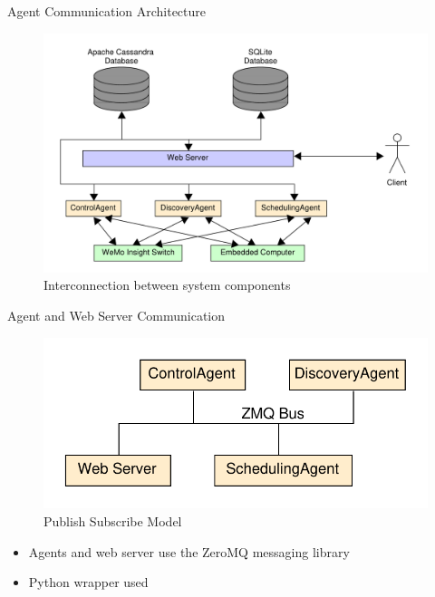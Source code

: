 \documentclass{beamer}
\begin{document}
\begin{frame}{Agent Communication Architecture}{}
    \begin{figure}
        \centering
        \includegraphics[scale=0.4]{figs/overallDiagram.pdf}
        \caption{Interconnection between system components}
        \label{fig:systemComponentInterconnection}
    \end{figure}
\end{frame}

\begin{frame}{Agent and Web Server Communication}{}
    \begin{figure}
        \centering
        \includegraphics[scale=0.5]{figs/pubSubAgents.pdf}
        \caption{Publish Subscribe Model}
        \label{fig:pubSubModel}
    \end{figure}
    \begin{itemize}
        \item Agents and web server use the ZeroMQ
        messaging library
        \item Python wrapper used
    \end{itemize}
\end{frame}
\end{document}
